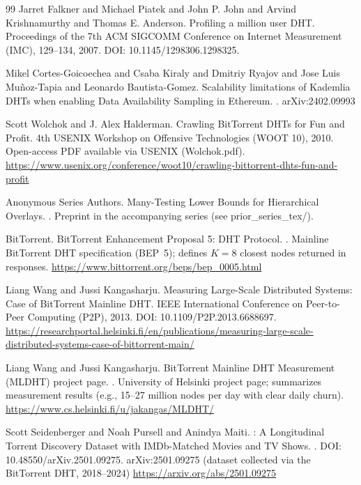 \documentclass[11pt]{article}
\begin{document}
\begin{thebibliography}{99}
Jarret Falkner and Michael Piatek and John P. John and Arvind Krishnamurthy and Thomas E. Anderson.
\newblock Profiling a million user DHT.
\newblock Proceedings of the 7th ACM SIGCOMM Conference on Internet Measurement (IMC), 129--134, 2007.
\newblock DOI: 10.1145/1298306.1298325.

Mikel Cortes-Goicoechea and Csaba Kiraly and Dmitriy Ryajov and Jose Luis Mu{\~n}oz-Tapia and Leonardo Bautista-Gomez.
\newblock Scalability limitations of Kademlia DHTs when enabling Data Availability Sampling in Ethereum.
.
\newblock arXiv:2402.09993

Scott Wolchok and J. Alex Halderman.
\newblock Crawling {BitTorrent} {DHTs} for Fun and Profit.
\newblock 4th USENIX Workshop on Offensive Technologies (WOOT 10), 2010.
\newblock Open-access PDF available via USENIX (Wolchok.pdf).
\newblock \url{https://www.usenix.org/conference/woot10/crawling-bittorrent-dhts-fun-and-profit}

Anonymous Series Authors.
\newblock Many-Testing Lower Bounds for Hierarchical Overlays.
.
\newblock Preprint in the accompanying series (see prior\_series\_tex/).

{BitTorrent}.
\newblock BitTorrent Enhancement Proposal 5: {DHT} Protocol.
.
\newblock Mainline BitTorrent DHT specification (BEP~5); defines $K=8$ closest nodes returned in responses.
\newblock \url{https://www.bittorrent.org/beps/bep_0005.html}

Liang Wang and Jussi Kangasharju.
\newblock Measuring Large-Scale Distributed Systems: Case of BitTorrent Mainline {DHT}.
\newblock IEEE International Conference on Peer-to-Peer Computing (P2P), 2013.
\newblock DOI: 10.1109/P2P.2013.6688697.
\newblock \url{https://researchportal.helsinki.fi/en/publications/measuring-large-scale-distributed-systems-case-of-bittorrent-main/}

Liang Wang and Jussi Kangasharju.
\newblock BitTorrent Mainline {DHT} Measurement (MLDHT) project page.
.
\newblock University of Helsinki project page; summarizes measurement results (e.g., 15--27 million nodes per day with clear daily churn).
\newblock \url{https://www.cs.helsinki.fi/u/jakangas/MLDHT/}

Scott Seidenberger and Noah Pursell and Anindya Maiti.
: A Longitudinal Torrent Discovery Dataset with IMDb-Matched Movies and TV Shows.
.
\newblock DOI: 10.48550/arXiv.2501.09275.
\newblock arXiv:2501.09275 (dataset collected via the BitTorrent DHT, 2018--2024)
\newblock \url{https://arxiv.org/abs/2501.09275}


\end{thebibliography}
\end{document}
